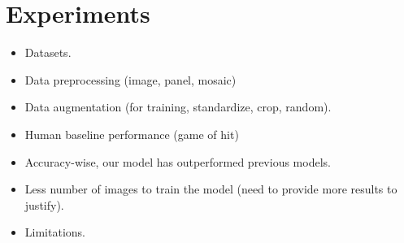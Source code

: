 \section{Experiments}

{
\color{gray} 

\begin{itemize}

    \item Datasets.

    \item Data preprocessing (image, panel, mosaic)

    \item Data augmentation (for training, standardize, crop, random).

    \item Human baseline performance (game of hit)

    \item Accuracy-wise, our model has outperformed previous models.  

    \item Less number of images to train the model (need to provide more results
    to justify).  

    \item Limitations.

\end{itemize}

}
